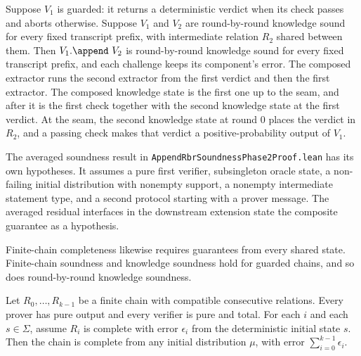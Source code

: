\begin{theorem}
    \label{thm:rbr_knowledge_soundness_append_guarded}
    Suppose $V_1$ is guarded: it returns a deterministic verdict when its check passes and aborts
    otherwise. Suppose $V_1$ and $V_2$ are round-by-round knowledge sound for every fixed
    transcript prefix, with intermediate relation $R_2$ shared between them. Then
    $V_1.\append\ V_2$ is round-by-round knowledge sound for every fixed transcript prefix, and
    each challenge keeps its component's error. The composed extractor runs the second extractor
    from the first verdict and then the first extractor. The composed knowledge state is the first
    one up to the seam, and after it is the first check together with the second knowledge state at
    the first verdict. At the seam, the second knowledge state at round $0$ places the verdict in
    $R_2$, and a passing check makes that verdict a positive-probability output of $V_1$.
    \leanok
\end{theorem}

\begin{remark}
    The averaged soundness result in \texttt{AppendRbrSoundnessPhase2Proof.lean} has its own
    hypotheses. It assumes a pure first verifier, subsingleton oracle state, a non-failing
    initial distribution with nonempty support, a nonempty intermediate statement type, and
    a second protocol starting with a prover message. The averaged residual interfaces in
    the downstream extension state the composite guarantee as a hypothesis.
\end{remark}

Finite-chain completeness likewise requires guarantees from every shared state.
Finite-chain soundness and knowledge soundness hold for guarded chains, and so does
round-by-round knowledge soundness.

\begin{theorem}
    \label{thm:completeness_compose}
    Let $R_0, \ldots, R_{k-1}$ be a finite chain with compatible consecutive relations.
    Every prover has pure output and every verifier is pure and total.
    For each $i$ and each $s \in \Sigma$, assume $R_i$ is complete with error $\epsilon_i$
    from the deterministic initial state $s$. Then the chain is complete from any initial
    distribution $\mu$, with error $\sum_{i=0}^{k-1} \epsilon_i$.
    \leanok
\end{theorem}

